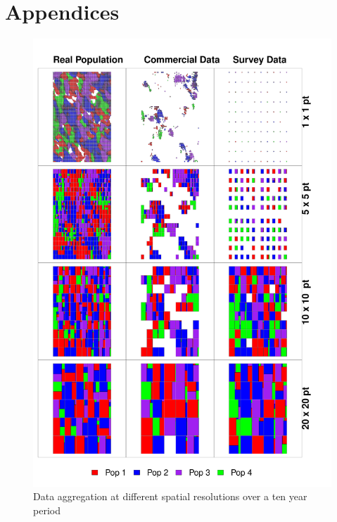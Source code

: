 \documentclass[review]{elsarticle}
\begin{document}
\section*{Appendices}



\clearpage
\footnotesize


\clearpage
\footnotesize



\begin{figure}[!ht]
	\includegraphics[width=\linewidth]{../analysis/Data_Aggregation_space_Rev}
	\caption{Data aggregation at different spatial resolutions over a
		ten year period}
	\label{fig:1}
\end{figure}	
\end{document}
